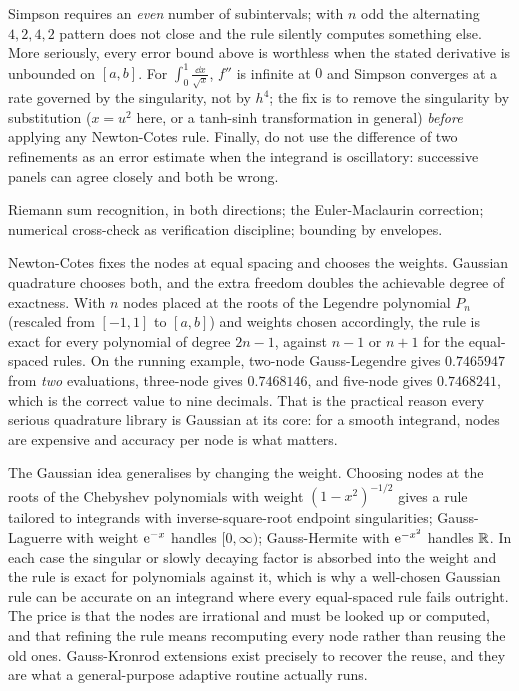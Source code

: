 \begin{trap}
Simpson requires an \emph{even} number of subintervals; with $n$ odd the alternating $4,2,4,2$ pattern does not close and the rule silently computes something else. More seriously, every error bound above is worthless when the stated derivative is unbounded on $[a,b]$. For $\int_0^{1}\tfrac{\dd x}{\sqrt x}$, $f''$ is infinite at $0$ and Simpson converges at a rate governed by the singularity, not by $h^{4}$; the fix is to remove the singularity by substitution ($x=u^{2}$ here, or a tanh-sinh transformation in general) \emph{before} applying any Newton-Cotes rule. Finally, do not use the difference of two refinements as an error estimate when the integrand is oscillatory: successive panels can agree closely and both be wrong.
\end{trap}

\begin{seealsob}Riemann sum recognition, in both directions; the Euler-Maclaurin correction; numerical cross-check as verification discipline; bounding by envelopes.\end{seealsob}

Newton-Cotes fixes the nodes at equal spacing and chooses the weights. Gaussian quadrature chooses both, and the extra freedom doubles the achievable degree of exactness. With $n$ nodes placed at the roots of the Legendre polynomial $P_{n}$ (rescaled from $[-1,1]$ to $[a,b]$) and weights chosen accordingly, the rule is exact for every polynomial of degree $2n-1$, against $n-1$ or $n+1$ for the equal-spaced rules. On the running example, two-node Gauss-Legendre gives $0.7465947$ from \emph{two} evaluations, three-node gives $0.7468146$, and five-node gives $0.7468241$, which is the correct value to nine decimals. That is the practical reason every serious quadrature library is Gaussian at its core: for a smooth integrand, nodes are expensive and accuracy per node is what matters.

The Gaussian idea generalises by changing the weight. Choosing nodes at the roots of the Chebyshev polynomials with weight $(1-x^{2})^{-1/2}$ gives a rule tailored to integrands with inverse-square-root endpoint singularities; Gauss-Laguerre with weight $\mathrm{e}^{-x}$ handles $[0,\infty)$; Gauss-Hermite with $\mathrm{e}^{-x^{2}}$ handles $\mathbb{R}$. In each case the singular or slowly decaying factor is absorbed into the weight and the rule is exact for polynomials against it, which is why a well-chosen Gaussian rule can be accurate on an integrand where every equal-spaced rule fails outright. The price is that the nodes are irrational and must be looked up or computed, and that refining the rule means recomputing every node rather than reusing the old ones. Gauss-Kronrod extensions exist precisely to recover the reuse, and they are what a general-purpose adaptive routine actually runs.

